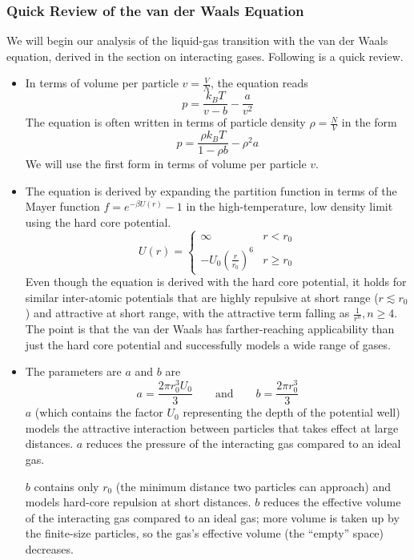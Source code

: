 \documentclass[11pt, a4paper]{article}
\begin{document}
\subsubsection{Quick Review of the van der Waals Equation}
We will begin our analysis of the liquid-gas transition with the van der Waals equation, derived in the section on interacting gases. Following is a quick review.
\begin{itemize}
	\item In terms of volume per particle $ v = \frac{V}{N} $, the equation reads
	\begin{equation*}
		p = \frac{k_{B}T}{v-b} - \frac{a}{v^{2}}
	\end{equation*}
	The equation is often written in terms of particle density $ \rho = \frac{N}{V} $ in the form
	\begin{equation*}
		p = \frac{\rho k_{B}T}{1 - \rho b} - \rho^{2}a
	\end{equation*}
	We will use the first form in terms of volume per particle $ v $.

	
	\item The equation is derived by expanding the partition function in terms of the Mayer function $ f = e^{-\beta U(r)} - 1 $ in the high-temperature, low density limit using the hard core potential.
	\begin{equation*}
		U(r) = \begin{cases}
			\infty & r < r_{0}\\
			-U_{0}\left(\frac{r}{r_{0}}\right)^{6} & r \geq r_{0}
		\end{cases}
	\end{equation*}
	Even though the equation is derived with the hard core potential, it holds for similar inter-atomic potentials that are highly repulsive at short range ($ r \lesssim r_{0}  $) and attractive at short range, with the attractive term falling as $ \frac{1}{r^{n}}, n \geq 4$. The point is that the van der Waals has farther-reaching applicability than just the hard core potential and successfully models a wide range of gases.
	
	\item The parameters are $ a $ and $ b $ are
	\begin{equation*}
		 a = \frac{2\pi r_{0}^{3}U_{0}}{3} \qquad \text{and} \qquad b = \frac{2\pi r_{0}^{3}}{3} 
	\end{equation*}
	$ a $ (which contains the factor $ U_{0} $ representing the depth of the potential well) models the attractive interaction between particles that takes effect at large distances. $ a $ reduces the pressure of the interacting gas compared to an ideal gas.

	$ b $ contains only $ r_{0} $ (the minimum distance two particles can approach) and models hard-core repulsion at short distances. $ b $ reduces the effective volume of the interacting gas compared to an ideal gas; more volume is taken up by the finite-size particles, so the gas's effective volume (the ``empty'' space) decreases. 
	
\end{itemize}
\end{document}
